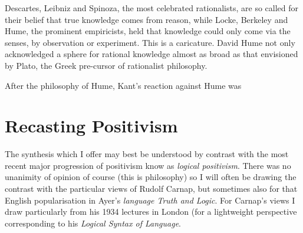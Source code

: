 \documentclass[10pt,titlepage]{book}
\begin{document}
Descartes, Leibniz and Spinoza, the most celebrated rationalists, are so called for their belief that true knowledge comes from reason, while Locke, Berkeley and Hume, the prominent empiricists, held that knowledge could only come via the senses, by observation or experiment.
This is a caricature.
David Hume not only acknowledged a sphere for rational knowledge almost as broad as that envisioned by Plato, the Greek pre-cursor of rationalist philosophy.

After the philosophy of Hume, Kant's reaction against Hume was

\section{Recasting Positivism}

The synthesis which I offer may best be understood by contrast with the most recent major progression of positivism know as \emph{logical positivism}.
There was no unanimity of opinion of course (this is philosophy) so I will often be drawing the contrast with the particular views of Rudolf Carnap, but sometimes also for that English popularisation in Ayer's \emph{language Truth and Logic}\cite{ayer36}.
For Carnap's views I draw particularly from his 1934 lectures in London (for a lightweight perspective corresponding to his \emph{Logical Syntax of Language}\cite{carnap37}.






{}



\label{index}
{\twocolumn[]
{\small\printindex}}





\end{document}
